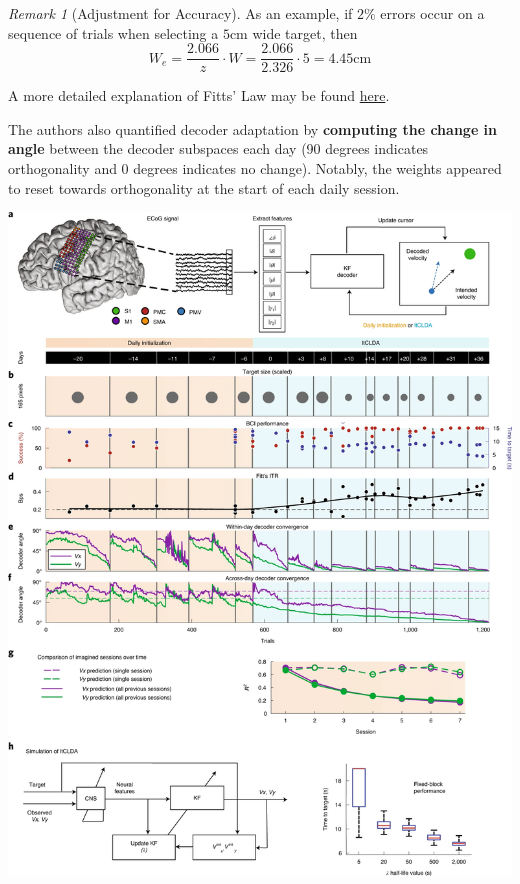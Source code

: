 \documentclass[11pt, a4paper, openany]{report}
\theoremstyle{definition}
\theoremstyle{remark}
\newtheorem{rmk}{Remark}
\begin{document}
\begin{rmk}[Adjustment for Accuracy]
    As an example, if \( 2\% \) errors occur on a sequence of trials when selecting a \( 5 \)cm wide target, then 
    \[ W_e = \frac{2.066}{z} \cdot W = \frac{2.066}{2.326} \cdot 5 = 4.45 \mathrm{cm} \]

    A more detailed explanation of Fitts' Law may be found \hyperref[https://onlinelibrary.wiley.com/doi/book/10.1002/9781118976005]{here}.

\end{rmk}

The authors also quantified decoder adaptation by \textbf{computing the change in angle} between the decoder subspaces each day (90 degrees indicates orthogonality and 0 degrees indicates no change). Notably, the weights appeared to reset towards orthogonality at the start of each daily session. 

\includegraphics[width=\linewidth]{images/silversmith1.png}
\end{document}
